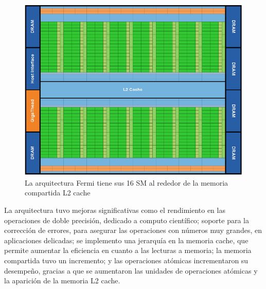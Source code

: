\begin{figure}[h]
			\centering
				\includegraphics[scale=0.7]{img/ArqFermi.png}
			\caption{La arquitectura Fermi tiene sus 16 SM al rededor de la memoria compartida L2 cache}
\end{figure}

La arquitectura tuvo mejoras significativas como el rendimiento en las operaciones de doble precisión, dedicado a computo científico; soporte para la corrección de errores, para asegurar las operaciones con números muy grandes, en aplicaciones delicadas; se implemento una jerarquía en la memoria cache, que permite aumentar la eficiencia en cuanto a las  lecturas a memoria; la memoria compartida tuvo un incremento; y las operaciones atómicas incrementaron su desempeño, gracias a que se aumentaron las unidades de operaciones atómicas y la aparición de la memoria L2 cache. 

